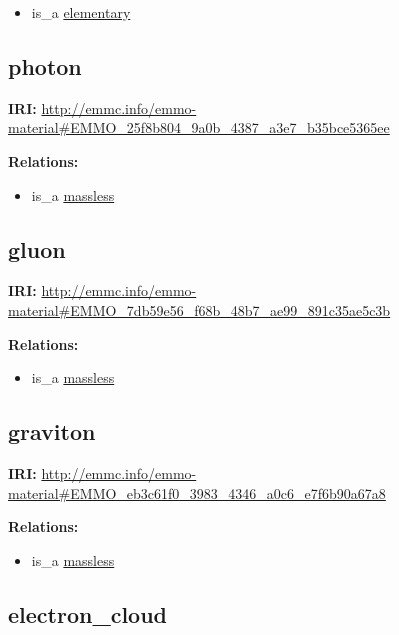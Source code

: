 \documentclass[a4paper,]{report}
\providecommand{\tightlist}{%
  \setlength{\itemsep}{0pt}\setlength{\parskip}{0pt}}
\begin{document}
\begin{itemize}
\tightlist
\item
  is\_a \protect\hyperlink{elementary}{elementary}
\end{itemize}

\hypertarget{photon-1}{%
\subsection{photon}\label{photon-1}}

\textbf{IRI:}
\url{http://emmc.info/emmo-material\#EMMO_25f8b804_9a0b_4387_a3e7_b35bce5365ee}

\textbf{Relations:}

\begin{itemize}
\tightlist
\item
  is\_a \protect\hyperlink{massless}{massless}
\end{itemize}

\hypertarget{gluon-1}{%
\subsection{gluon}\label{gluon-1}}

\textbf{IRI:}
\url{http://emmc.info/emmo-material\#EMMO_7db59e56_f68b_48b7_ae99_891c35ae5c3b}

\textbf{Relations:}

\begin{itemize}
\tightlist
\item
  is\_a \protect\hyperlink{massless}{massless}
\end{itemize}

\hypertarget{graviton-1}{%
\subsection{graviton}\label{graviton-1}}

\textbf{IRI:}
\url{http://emmc.info/emmo-material\#EMMO_eb3c61f0_3983_4346_a0c6_e7f6b90a67a8}

\textbf{Relations:}

\begin{itemize}
\tightlist
\item
  is\_a \protect\hyperlink{massless}{massless}
\end{itemize}

\hypertarget{electron_cloud}{%
\subsection{electron\_cloud}\label{electron_cloud}}
\end{document}
